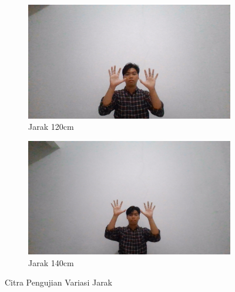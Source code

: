 \begin{figure}[H]
  \begin{subfigure}{0.4\textwidth}
    \centering
    \includegraphics[width=\linewidth]{../Gambar/120cm.jpg}
    \caption{Jarak 120cm}
    \label{fig:jarak120cm}
  \end{subfigure}
  \begin{subfigure}{0.4\textwidth}
    \centering
    \includegraphics[width=\linewidth]{../Gambar/140cm.jpg}
    \caption{Jarak 140cm}
    \label{fig:jarak140cm}
  \end{subfigure}
  \centering
  \caption{Citra Pengujian Variasi Jarak}
  \label{fig:jarakkeseluruhan}
\end{figure}


